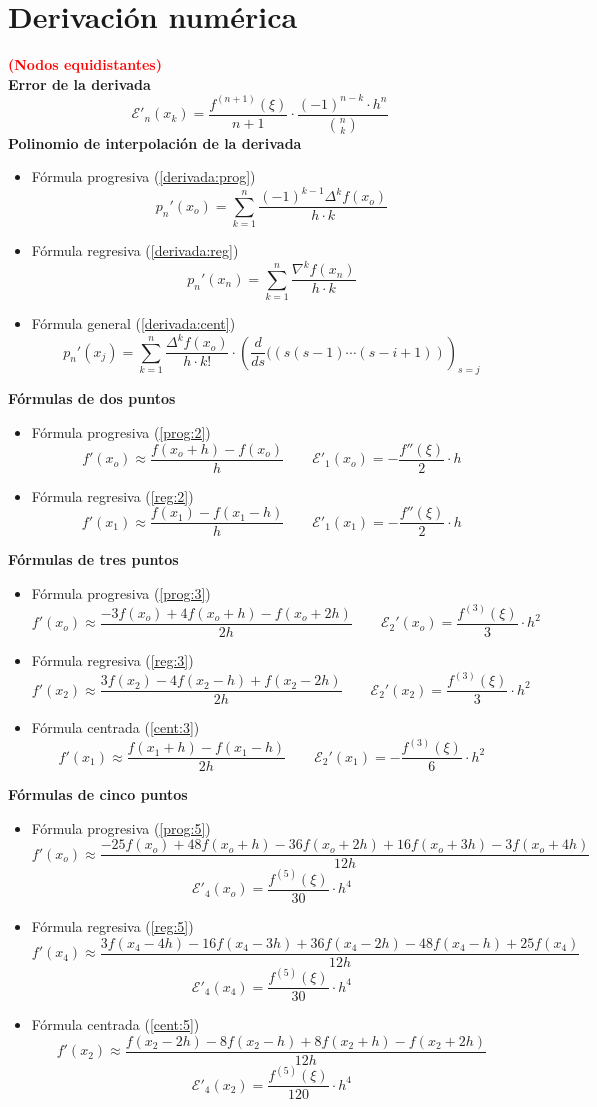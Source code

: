 \section*{Derivación numérica}
\vspace{-5mm}\textbf{\textcolor{red}{(Nodos equidistantes)}}\\
\noindent \textbf{Error de la derivada}
$$\mathcal{E}'_n(x_k) = \dfrac{f^{(n+1)}(\xi)}{n+1} \cdot \dfrac{(-1)^{n-k}\cdot h^n}{\binom{n}{k}}$$
\noindent \textbf{Polinomio de interpolación de la derivada}
\begin{itemize}
    \item Fórmula progresiva (\ref{derivada:prog})
    $$p_n'(x_o)=\sum_{k=1}^n\dfrac{(-1)^{k-1}\Delta^k f(x_o)}{h\cdot k}$$
    \item Fórmula regresiva (\ref{derivada:reg})
    $$p_n'(x_n)=\sum_{k=1}^n\dfrac{\nabla^k f(x_n)}{h\cdot k}$$
    \item Fórmula general (\ref{derivada:cent})
    $$p_n'(x_j)=\sum_{k=1}^n\dfrac{\Delta^k f(x_o)}{h\cdot k!}\cdot \left(\dfrac{d}{ds}((s(s-1)\cdots(s-i+1))\right)_{s=j}$$
\end{itemize}
\noindent \textbf{Fórmulas de dos puntos}
\begin{itemize}
    \item Fórmula progresiva (\ref{prog:2})
    $$f'(x_o)\approx \dfrac{f(x_o+h)-f(x_o)}{h}\qquad \mathcal{E}'_1(x_o)=-\dfrac{f''(\xi)}{2}\cdot h$$
    \item Fórmula regresiva (\ref{reg:2})
    $$f'(x_1)\approx \dfrac{f(x_1)-f(x_1-h)}{h}\qquad \mathcal{E}'_1(x_1)=-\dfrac{f''(\xi)}{2}\cdot h$$   
\end{itemize}
\textbf{Fórmulas de tres puntos}
\begin{itemize}
    \item Fórmula progresiva (\ref{prog:3})
$$f'(x_o)\approx\frac{-3f(x_o)+4f(x_o+h)-f(x_o+2h)}{2h}\qquad\mathcal{E}_2'(x_o)=\dfrac{f^{(3)}(\xi)}{3}\cdot h^2$$
    \item Fórmula regresiva (\ref{reg:3})
 $$f'(x_2)\approx \frac{3f(x_2)-4f(x_2-h)+f(x_2-2h)}{2h}\qquad \mathcal{E}_2'(x_2)=\dfrac{f^{(3)}(\xi)}{3}\cdot h^2$$
    \item Fórmula centrada (\ref{cent:3})
  $$f'(x_1)\approx \dfrac{f(x_1+h)-f(x_1-h)}{2h}\qquad \mathcal{E}_2'(x_1)=-\dfrac{f^{(3)}(\xi)}{6}\cdot h^2$$ 
\end{itemize}
\textbf{Fórmulas de cinco puntos}
\begin{itemize}
    \item Fórmula progresiva (\ref{prog:5})
$$f'(x_o)\approx \dfrac{-25f(x_o)+48f(x_o+h)-36f(x_o+2h)+16f(x_o+3h)-3f(x_o+4h)}{12h}$$
$$\mathcal{E}'_4(x_o)=\dfrac{f^{(5)}(\xi)}{30}\cdot h^4$$
    \item Fórmula regresiva (\ref{reg:5})
 $$f'(x_4)\approx \dfrac{3f(x_4-4h)-16f(x_4-3h)+36f(x_4-2h)-48f(x_4-h)+25f(x_4)}{12h}$$
 $$ \mathcal{E}'_4(x_4)=\dfrac{f^{(5)}(\xi)}{30}\cdot h^4$$
    \item Fórmula centrada (\ref{cent:5})
  $$f'(x_2)\approx\dfrac{f(x_2-2h)-8f(x_2-h)+8f(x_2+h)-f(x_2+2h)}{12h}$$ 
  $$\mathcal{E}'_4(x_2)=\dfrac{f^{(5)}(\xi)}{120}\cdot h^4$$ 
\end{itemize}
